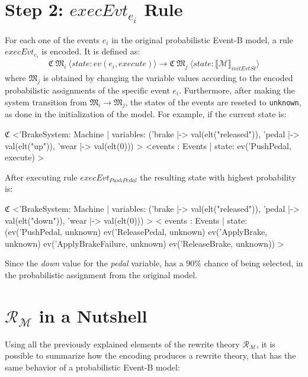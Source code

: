\section{Step 2: $execEvt_{e_i}$ Rule}
For each one of the events $e_i$ in the original probabilistic Event-B model, a rule $execEvt_{e_i}$ is encoded. It is defined as: 
\begin{align*}
    \mathfrak{C} \ \mathfrak{M}_i \ \langle state: ev(e_i, execute) \rangle \rightarrow \mathfrak{C} \ \mathfrak{M}_j \ \langle state: \llbracket \mathscr{M} \rrbracket_{initEvtSt} \rangle
\end{align*}
where $\mathfrak{M}_j$ is obtained by changing the variable values according to the encoded probabilistic assignments of the specific event $e_i$. Furthermore, after making the system transition from $\mathfrak{M}_i \rightarrow \mathfrak{M}_j$, the states of the events are reseted to \texttt{unknown}, as done in the initialization of the model.
For example, if the current state is:
\begin{maude}

$\mathfrak{C}$ <'BrakeSystem: Machine | variables: ('brake |-> val(elt("released")), 
                                        'pedal |-> val(elt("up")), 
                                        'wear |-> val(elt(0))) >
  <events : Events | state: ev('PushPedal, execute) >
\end{maude}
After executing rule $execEvt_{PushPedal}$ the resulting state with highest probability is:
\begin{maude}

$\mathfrak{C}$ <'BrakeSystem: Machine | variables: ('brake |-> val(elt("released")), 
                                        'pedal |-> val(elt("down")), 
                                        'wear |-> val(elt(0))) >
  < events : Events | state: (ev('PushPedal, unknown) 
                              ev('ReleasePedal, unknown) 
                              ev('ApplyBrake, unknown) 
                              ev('ApplyBrakeFailure, unknown) 
                              ev('ReleaseBrake, unknown)) >
\end{maude}
Since the \textit{down} value for the \textit{pedal} variable, has a $90\%$ chance of being selected, in the probabilistic assignment from the original model.

\section{$\mathscr{R}_\mathscr{M}$ in a Nutshell}
Using all the previously explained elements of the rewrite theory $\mathscr{R}_\mathscr{M}$, it is possible to summarize how the encoding produces a rewrite theory, that has the same behavior of a probabilistic Event-B model: 


